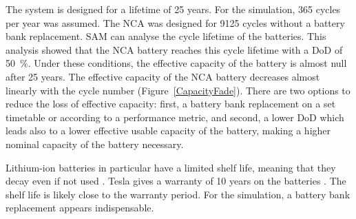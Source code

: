 The system is designed for a lifetime of 25 years. For the simulation, 365 cycles per year was assumed. The \ac{NCA} was designed for \num{9125} cycles without a battery bank replacement. \ac{SAM} can analyse the cycle lifetime of the batteries. This analysis showed that the \ac{NCA} battery reaches this cycle lifetime with a \ac{DoD} of \SI{50}{\percent}. Under these conditions, the effective capacity of the battery is almost null after 25 years. The effective capacity of the \ac{NCA} battery decreases almost linearly with the cycle number (Figure~\ref{CapacityFade}). There are two options to reduce the loss of effective capacity: first, a battery bank replacement on a set timetable or according to a performance metric, and second, a lower \ac{DoD} which leads also to a lower effective usable capacity of the battery, making a higher nominal capacity of the battery necessary.


Lithium-ion batteries in particular have a limited shelf life, meaning that they decay even if not used \cite{Jossen2006}. Tesla gives a warranty of 10 years on the batteries \cite{Shahan2015}. The shelf life is likely close to the warranty period. For the simulation, a battery bank replacement appears indispensable.


